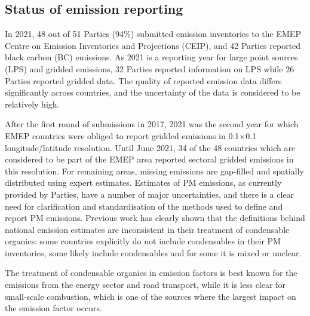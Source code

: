 \subsection*{Status of emission reporting}

In 2021, 48 out of 51 Parties (94$\%$) submitted emission inventories to the EMEP Centre on Emission Inventories and Projections (CEIP), and 42 Parties reported black carbon (BC) emissions. As 2021 is a reporting year for large point sources (LPS) and gridded emissions, 32 Parties reported information on LPS while 26 Parties reported gridded data. The quality of reported emission data differs significantly across countries, and the uncertainty of the data is considered to be relatively high.

After the first round of submissions in 2017, 2021 was the second year for which EMEP countries were obliged to report gridded emissions in  0.1{\degrees}$\times$0.1{\degrees} lon\-gi\-tude/la\-ti\-tude resolution. Until June 2021, 34 of the 48 countries which are considered to be part of the EMEP area reported sectoral gridded emissions in this resolution. For remaining areas, missing emissions are gap-filled and spatially distributed using expert estimates.
Estimates of PM emissions, as currently provided by Parties, have a number of major uncertainties, and there is a clear need for clarification and standardisation of the methods used to define and report PM emissions.
Previous work has clearly shown that the definitions behind national emission estimates are inconsistent in their treatment of condensable organics: some countries explicitly do not include condensables in their PM inventories, some likely include condensables and for some it is mixed or unclear.

The treatment of condensable organics in emission factors is best known for the emissions from the energy sector and road transport, while it is less clear for small-scale combustion, which is one of the sources where the largest impact on the emission factor occurs.

